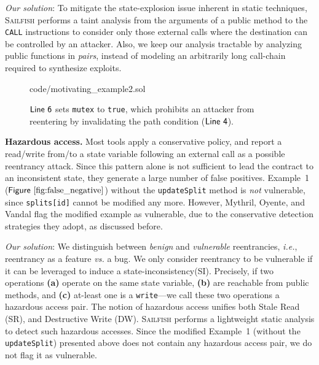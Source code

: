 \documentclass[conference, romanappendices]{tex/IEEEtran}
\theoremstyle{bfnote}
\newcommand{\toolname}{\textsc{Sailfish}\xspace}
\newcommand{\oyente}{{\sc Oyente}\xspace}
\newcommand{\vandal}{{\sc Vandal}\xspace}
\newcommand{\reentrancy}{{reentrancy}\xspace}
\newcommand{\haz}{{hazardous access}\xspace}
\newcommand{\si}{{state-inconsistency}\xspace}
\newcommand{\mythril}{{\sc Mythril}\xspace}
\newcommand{\ie}{\textit{i.e.}}
\newcommand{\Line}[1]{\ensuremath{\sf Line~ #1}}
\newcommand{\Fig}[1]{\ensuremath{\sf Figure~\ref{#1}}}
\begin{document}
\textit{Our solution}: To mitigate the state-explosion issue inherent in static techniques, \toolname{} performs a taint analysis from the arguments of a public method to the \texttt{CALL} instructions to consider only those external calls where the destination can be controlled by an attacker.
Also, we keep our analysis tractable by analyzing public functions in \textit{pairs}, instead of modeling an arbitrarily long call-chain required to synthesize exploits.

\begin{figure}[t]
		{ \centering
			
			{code/motivating_example2.sol}
		}
	\vspace{-0.15in}
	\caption{\small \Line{6} sets \texttt{mutex} to \texttt{true}, which prohibits an attacker from reentering
	by invalidating the path condition (\Line{4}).}
	\label{fig:false_positive}
	\vspace{-6mm}
\end{figure}

\noindent
\textbf{Hazardous access.}
Most tools apply a conservative policy, and report a read/write from/to a state variable following an external call as a possible \reentrancy attack.
Since this pattern alone is not sufficient to lead the contract to an inconsistent state, they generate a large number of false positives.
Example~1 (\Fig{fig:false_negative}) without the \texttt{updateSplit} method is \textit{not} vulnerable, since \texttt{splits[id]} cannot be modified any more.
However, \mythril, \oyente{}, and \vandal{} flag the modified example as vulnerable, due to the conservative detection strategies they adopt, as discussed before.

\textit{Our solution}:
We distinguish between \textit{benign} and \textit{vulnerable} reentrancies, \ie, \reentrancy as a feature \textit{vs.} a bug.
We only consider \reentrancy to be vulnerable if it can be leveraged to induce a \si (SI).
Precisely, if two operations 
\textbf{(a)} operate on the same state variable,
\textbf{(b)} are reachable from public methods, and
\textbf{(c)} at-least one is a \texttt{write}---we call these two operations a \haz pair. 
The notion of \haz unifies both Stale Read (SR), and Destructive Write (DW).
\toolname performs a lightweight static analysis to detect such hazardous accesses.
Since the modified Example~1 (without the \texttt{updateSplit}) presented above does not contain any hazardous access pair, we do not flag it as vulnerable.
\end{document}

